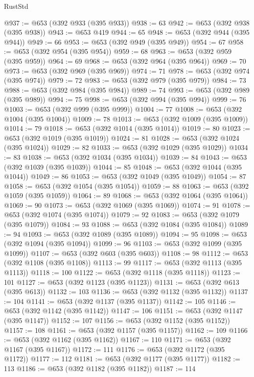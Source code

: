 \begin{lexlean}{RustStd}
\begin{coremodule}
@937 := @653 (@392 @933 (@395 @933))
@938 := 63
@942 := @653 (@392 @938 (@395 @938))
@943 := @653 @419
@944 := 65
@948 := @653 (@392 @944 (@395 @944))
@949 := 66
@953 := @653 (@392 @949 (@395 @949))
@954 := 67
@958 := @653 (@392 @954 (@395 @954))
@959 := 68
@963 := @653 (@392 @959 (@395 @959))
@964 := 69
@968 := @653 (@392 @964 (@395 @964))
@969 := 70
@973 := @653 (@392 @969 (@395 @969))
@974 := 71
@978 := @653 (@392 @974 (@395 @974))
@979 := 72
@983 := @653 (@392 @979 (@395 @979))
@984 := 73
@988 := @653 (@392 @984 (@395 @984))
@989 := 74
@993 := @653 (@392 @989 (@395 @989))
@994 := 75
@998 := @653 (@392 @994 (@395 @994))
@999 := 76
@1003 := @653 (@392 @999 (@395 @999))
@1004 := 77
@1008 := @653 (@392 @1004 (@395 @1004))
@1009 := 78
@1013 := @653 (@392 @1009 (@395 @1009))
@1014 := 79
@1018 := @653 (@392 @1014 (@395 @1014))
@1019 := 80
@1023 := @653 (@392 @1019 (@395 @1019))
@1024 := 81
@1028 := @653 (@392 @1024 (@395 @1024))
@1029 := 82
@1033 := @653 (@392 @1029 (@395 @1029))
@1034 := 83
@1038 := @653 (@392 @1034 (@395 @1034))
@1039 := 84
@1043 := @653 (@392 @1039 (@395 @1039))
@1044 := 85
@1048 := @653 (@392 @1044 (@395 @1044))
@1049 := 86
@1053 := @653 (@392 @1049 (@395 @1049))
@1054 := 87
@1058 := @653 (@392 @1054 (@395 @1054))
@1059 := 88
@1063 := @653 (@392 @1059 (@395 @1059))
@1064 := 89
@1068 := @653 (@392 @1064 (@395 @1064))
@1069 := 90
@1073 := @653 (@392 @1069 (@395 @1069))
@1074 := 91
@1078 := @653 (@392 @1074 (@395 @1074))
@1079 := 92
@1083 := @653 (@392 @1079 (@395 @1079))
@1084 := 93
@1088 := @653 (@392 @1084 (@395 @1084))
@1089 := 94
@1093 := @653 (@392 @1089 (@395 @1089))
@1094 := 95
@1098 := @653 (@392 @1094 (@395 @1094))
@1099 := 96
@1103 := @653 (@392 @1099 (@395 @1099))
@1107 := @653 (@392 @603 (@395 @603))
@1108 := 98
@1112 := @653 (@392 @1108 (@395 @1108))
@1113 := 99
@1117 := @653 (@392 @1113 (@395 @1113))
@1118 := 100
@1122 := @653 (@392 @1118 (@395 @1118))
@1123 := 101
@1127 := @653 (@392 @1123 (@395 @1123))
@1131 := @653 (@392 @613 (@395 @613))
@1132 := 103
@1136 := @653 (@392 @1132 (@395 @1132))
@1137 := 104
@1141 := @653 (@392 @1137 (@395 @1137))
@1142 := 105
@1146 := @653 (@392 @1142 (@395 @1142))
@1147 := 106
@1151 := @653 (@392 @1147 (@395 @1147))
@1152 := 107
@1156 := @653 (@392 @1152 (@395 @1152))
@1157 := 108
@1161 := @653 (@392 @1157 (@395 @1157))
@1162 := 109
@1166 := @653 (@392 @1162 (@395 @1162))
@1167 := 110
@1171 := @653 (@392 @1167 (@395 @1167))
@1172 := 111
@1176 := @653 (@392 @1172 (@395 @1172))
@1177 := 112
@1181 := @653 (@392 @1177 (@395 @1177))
@1182 := 113
@1186 := @653 (@392 @1182 (@395 @1182))
@1187 := 114

\end{coremodule}
\end{lexlean}
